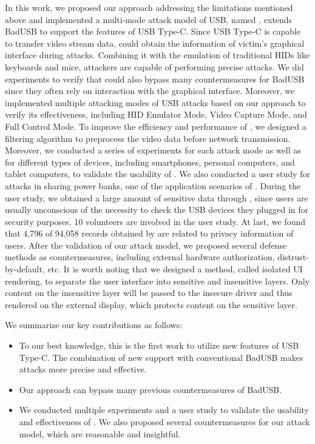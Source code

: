 In this work, we proposed our approach addressing the limitations mentioned
above and implemented a multi-mode attack model of USB, named \tool.  \tool
extends BadUSB to support the features of USB Type-C.  Since USB Type-C is
capable to transfer video stream data, \tool could obtain the information of
victim's graphical interface during attacks.  Combining it with the emulation
of traditional HIDs like keyboards and mice, attackers are capable of
performing precise attacks.  We did experiments to verify that \tool could also
bypass many countermeasures for BadUSB since they often rely on interaction
with the graphical interface.  Moreover, we implemented multiple attacking
modes of USB attacks based on our approach to verify its effectiveness,
including HID Emulator Mode, Video Capture Mode, and Full Control Mode.  To improve the
efficiency and performance of \tool, we designed a filtering algorithm to
preprocess the video data before network transmission.  Moreover, we conducted
a series of experiments for each attack mode as well as for different types of
devices, including smartphones, personal computers, and tablet computers, to
validate the usability of \tool.  We also conducted a user study for attacks in
sharing power banks, one of the application scenarios of \tool.  During the
user study, we obtained a large amount of sensitive data through \tool, since
users are usually unconscious of the necessity to check the USB devices they
plugged in for security purposes.  
10 volunteers are involved in the user study.
At last, we found that 4,796 of 94,058 records obtained by \tool are related to privacy information of users.
After the validation of our attack model, we
proposed several defense methods as countermeasures, including external
hardware authorization, distrust-by-default, etc.  It is worth noting that we
designed a method, called isolated UI rendering, to separate the user interface
into sensitive and insensitive layers.  Only content on the insensitive layer
will be passed to the insecure driver and thus rendered on the external
display, which protects content on the sensitive layer.

We summarize our key contributions as follows:

\begin{itemize} 
    
    \item To our best knowledge, this is the first work to utilize new features
	of USB Type-C.  The combination of new support with conventional BadUSB
	makes attacks more precise and effective.
	
    \item Our approach can bypass many previous countermeasures of BadUSB.
	
    \item We conducted multiple experiments and a user study to validate the
	usability and effectiveness of \tool.  We also proposed several
	countermeasures for our attack model, which are reasonable and
	insightful. 
\end{itemize}

